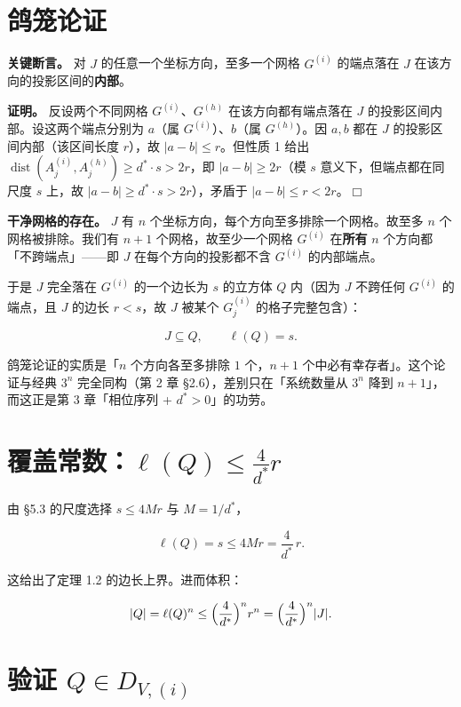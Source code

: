 \documentclass[a4paper,11pt,openany]{ctexbook}
\numberwithin{equation}{chapter}
\numberwithin{figure}{chapter}
\numberwithin{table}{chapter}
\begin{document}
\section{鸽笼论证}

\textbf{关键断言。} 对 $J$ 的任意一个坐标方向，至多一个网格 $G^{(i)}$ 的端点落在 $J$ 在该方向的投影区间的\textbf{内部}。

\textbf{证明。} 反设两个不同网格 $G^{(i)}$、$G^{(h)}$ 在该方向都有端点落在 $J$ 的投影区间内部。设这两个端点分别为 $a$（属 $G^{(i)}$）、$b$（属 $G^{(h)}$）。因 $a,b$ 都在 $J$ 的投影区间内部（该区间长度 $r$），故 $|a-b|\le r$。但性质 1 给出 $\operatorname{dist}(A_j^{(i)},A_j^{(h)})\ge d^*\cdot s>2r$，即 $|a-b|\ge2r$（模 $s$ 意义下，但端点都在同尺度 $s$ 上，故 $|a-b|\ge d^*\cdot s>2r$），矛盾于 $|a-b|\le r<2r$。$\Box$

\textbf{干净网格的存在。} $J$ 有 $n$ 个坐标方向，每个方向至多排除一个网格。故至多 $n$ 个网格被排除。我们有 $n+1$ 个网格，故至少一个网格 $G^{(i)}$ 在\textbf{所有} $n$ 个方向都「不跨端点」——即 $J$ 在每个方向的投影都不含 $G^{(i)}$ 的内部端点。

于是 $J$ 完全落在 $G^{(i)}$ 的一个边长为 $s$ 的立方体 $Q$ 内（因为 $J$ 不跨任何 $G^{(i)}$ 的端点，且 $J$ 的边长 $r<s$，故 $J$ 被某个 $G_j^{(i)}$ 的格子完整包含）：

$$J\subseteq Q,\qquad \ell(Q)=s.$$

\begin{intuitionbox}
鸽笼论证的实质是「$n$ 个方向各至多排除 $1$ 个，$n+1$ 个中必有幸存者」。这个论证与经典 $3^n$ 完全同构（第 2 章 §2.6），差别只在「系统数量从 $3^n$ 降到 $n+1$」，而这正是第 3 章「相位序列 + $d^*>0$」的功劳。
\end{intuitionbox}

\section{覆盖常数：$\ell(Q)\le\frac4{d^*}r$}

由 §5.3 的尺度选择 $s\le4Mr$ 与 $M=1/d^*$，

$$\ell(Q)=s\le4Mr=\frac4{d^*}\,r.$$

这给出了定理 1.2 的边长上界。进而体积：

$$|Q|=\ell(Q)^n\le\Bigl(\frac4{d^*}\Bigr)^n r^n=\Bigl(\frac4{d^*}\Bigr)^n|J|.$$

\section{验证 $Q\in D_{V,(i)}$}
\end{document}
